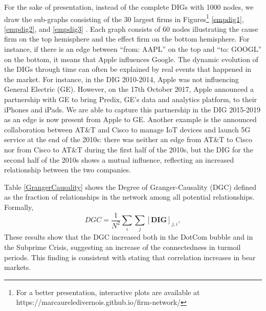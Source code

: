 For the sake of presentation, instead of the complete DIGs with 1000 nodes, we draw the sub-graphs consisting of the 30 largest firms in Figures\footnote{For a better presentation, interactive plots are available at https://marcaureledivernois.github.io/firm-network/} \ref{empdig1}, \ref{empdig2}, and \ref{empdig3} . 
Each graph consists of 60 nodes illustrating the cause firm on the top hemisphere and the effect firm on the bottom hemisphere.
For instance, if there is an edge between ``from: AAPL'' on the top and ``to: GOOGL'' on the bottom, it means that Apple influences Google. The dynamic evolution of the DIGs through time can often be explained by real events that happened in the market. For instance, in the DIG 2010-2014, Apple was not influencing General Electric (GE). However, on the 17th October 2017, Apple announced a partnership with GE to bring Predix, GE's data and analytics platform, to their iPhones and iPads. We are able to capture this partnership in the DIG 2015-2019 as an edge is now present from Apple to GE. Another example is the announced collaboration between AT\&T and Cisco to manage IoT devices and launch 5G service at the end of the 2010s: 
there was neither an edge from AT\&T to Cisco nor from  Cisco to AT\&T during the first half of the 2010s, but the DIG for the second half of the 2010s shows a mutual influence, reflecting an increased relationship between the two companies.

Table \ref{GrangerCausality} shows the Degree of Granger-Causality (DGC) defined as the fraction of relationships in the network among all potential relationships. Formally,
\begin{equation}
    DGC = \dfrac{1}{N^2} \sum_i \sum_j [\textbf{DIG}]_{j,i},
\end{equation}
These results show that the DGC increased both in the DotCom bubble and in the Subprime Crisis, suggesting an increase of the connectedness in turmoil periods. 
This finding is consistent with \citet{correlcrisis} stating that correlation increases in bear markets.

